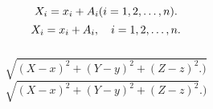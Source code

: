 \documentclass[a4paper,11pt]{article}
\begin{document}
\noi
{} \\
\Jest
\begin{equation*}
  X_{ i } = x_{ i } + A_{ i } ( i = 1, 2, \ldots, n ).
\end{equation*}
\Pow
\begin{equation*}
  X_{ i } = x_{ i } + A_{ i }, \quad i = 1, 2, \ldots, n.
\end{equation*}
 \\
\Jest
\begin{equation*}
  \sqrt{ ( X - x )^{ 2 } + ( Y - y )^{ 2 } + ( Z - z )^{ 2 } .) }
\end{equation*}
\Pow
\begin{equation*}
  \sqrt{ ( X - x )^{ 2 } + ( Y - y )^{ 2 } + ( Z - z )^{ 2 } }.)
\end{equation*}

\vspace{\spaceTwo}





 {}



\end{document}
